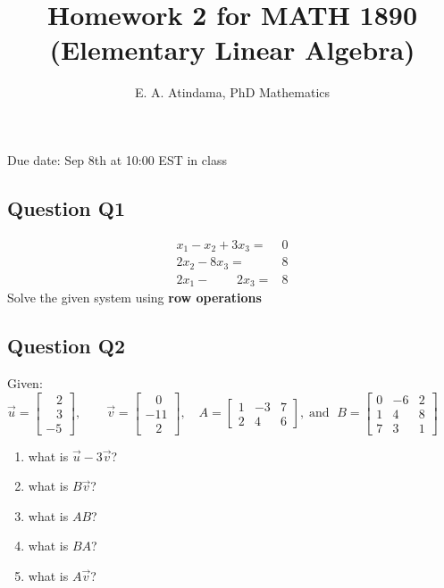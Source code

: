 \documentclass[a4paper,11pt,reqno]{amsart}
\title[MATH 1890 (Elementary Linear Algebra)]{Homework 2 for MATH 1890 (Elementary Linear Algebra)}
\author[Emmanuel Atindama]{E. A. Atindama, PhD Mathematics}
\numberwithin{equation}{section}
\begin{document}
\maketitle

Due date: Sep 8th at 10:00 EST in class

\subsection*{Question Q1}\label{sec:q1}
\begin{align*}
    x_1 - x_2 + 3x_3 =& 0\\
       2x_2 - 8x_3  =& 8\\
     2x_1 -\;\;\quad\;\; 2x_3 =& 8
\end{align*}
Solve the given system using \textbf{row operations}


\subsection*{Question Q2}

Given:\(\vec{u}=\begin{bmatrix}\;\;\;2\\ \;\;\;3\\-5\end{bmatrix},\qquad \vec{v}= \begin{bmatrix}\;\;\;0\\ -11\\\;\;\;2\end{bmatrix}, \quad A=\left[\begin{matrix}1& -3& 7\\ 2& 4& 6 \end{matrix}\right], \;\text{and }\; B=\left[\begin{matrix}0& -6& 2\\ 1& 4& 8\\7 & 3 & 1 \end{matrix}\right]\)
\begin{enumerate}[a]
    \item what is \(\vec{u}-3\vec{v}\)?
    \item what is \(B\vec{v}\)?
    \item what is \(AB\)?
    \item what is \(BA\)?
    \item what is \(A\vec{v}\)?
\end{enumerate}
\end{document}
